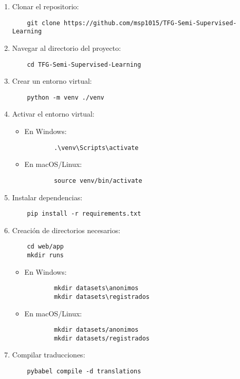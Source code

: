 \begin{enumerate}
    \item Clonar el repositorio:
    \begin{verbatim}
    git clone https://github.com/msp1015/TFG-Semi-Supervised-Learning
    \end{verbatim}

    \item Navegar al directorio del proyecto:
    \begin{verbatim}
    cd TFG-Semi-Supervised-Learning
    \end{verbatim}

    \item Crear un entorno virtual:
    \begin{verbatim}
    python -m venv ./venv
    \end{verbatim}

    \item Activar el entorno virtual:
    \begin{itemize}
        \item En Windows:
        \begin{verbatim}
        .\venv\Scripts\activate
        \end{verbatim}

        \item En macOS/Linux:
        \begin{verbatim}
        source venv/bin/activate
        \end{verbatim}
    \end{itemize}

    \item Instalar dependencias:
    \begin{verbatim}
    pip install -r requirements.txt
    \end{verbatim}

    \item Creación de directorios necesarios:
    \begin{verbatim}
    cd web/app
    mkdir runs
    \end{verbatim}

    \begin{itemize}
        \item En Windows:
        \begin{verbatim}
        mkdir datasets\anonimos
        mkdir datasets\registrados
        \end{verbatim}

        \item En macOS/Linux:
        \begin{verbatim}
        mkdir datasets/anonimos
        mkdir datasets/registrados
        \end{verbatim}
    \end{itemize}

    \item Compilar traducciones:
    \begin{verbatim}
    pybabel compile -d translations
    \end{verbatim}
\end{enumerate}

